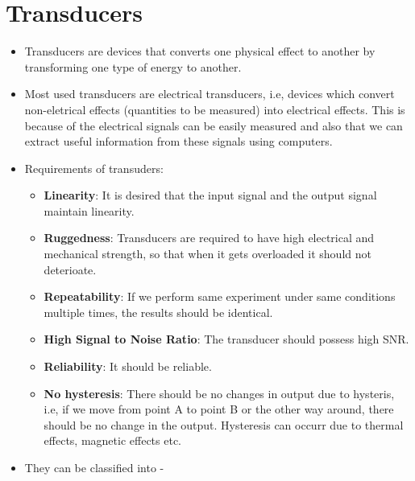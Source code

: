 \documentclass{article}
\begin{document}
\section{Transducers}
	\begin{itemize}
		\item Transducers are devices that converts one physical effect to another by transforming one type of energy to another.
		\item Most used transducers are electrical transducers, i.e, devices which convert non-eletrical effects (quantities to be measured) into electrical effects. This is because of the electrical signals can be easily measured and also that we can extract useful information from these signals using computers.

		\item Requirements of transuders:
		\begin{itemize}
			\item \textbf{Linearity}: It is desired that the input signal and the output signal maintain linearity.
			\item \textbf{Ruggedness}: Transducers are required to have high electrical and mechanical strength, so that when it gets overloaded it should not deterioate.
			\item \textbf{Repeatability}: If we perform same experiment under same conditions multiple times, the results should be identical.
			\item \textbf{High Signal to Noise Ratio}: The transducer should possess high SNR.
			\item \textbf{Reliability}: It should be reliable.
			\item \textbf{No hysteresis}: There should be no changes in output due to hysteris, i.e, if we move from point A to point B or the other way around, there should be no change in the output. Hysteresis can occurr due to thermal effects, magnetic effects etc.
		\end{itemize} 

		\item They can be classified into - \\


\end{itemize}
\end{document}
